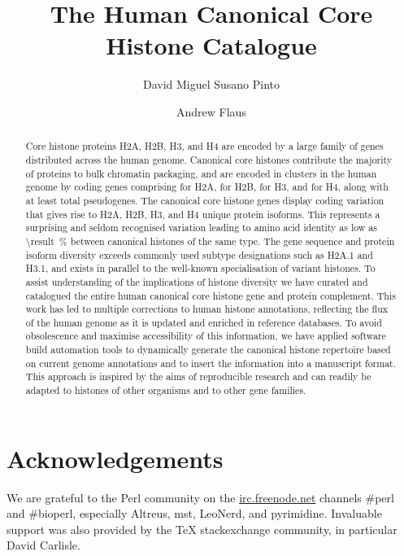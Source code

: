 \documentclass[10pt,a4paper,onecolumn,article,draft]{memoir}
\author{David Miguel Susano Pinto \and Andrew Flaus}
\title{The Human Canonical Core Histone Catalogue}
\begin{document}
  \maketitle

  \begin{abstract}
    Core histone proteins H2A, H2B, H3, and H4 are encoded
    by a large family of genes distributed across the human genome.
    Canonical core histones contribute the majority of proteins to bulk
    chromatin packaging,
    and are encoded in \NumberOfClusters{} clusters in the human genome
    by \TotalCoreCodingGenes{} coding genes comprising
    \HTwoACodingGenes{} for H2A,
    \HTwoBCodingGenes{} for H2B,
    \HThreeCodingGenes{} for H3,
    and \HFourCodingGenes{} for H4,
    along with at least \TotalCorePseudoGenes{} total pseudogenes.
    The canonical core histone genes display coding variation that gives rise to
    \HTwoAUniqueProteins{} H2A, \HTwoBUniqueProteins{} H2B,
    \HThreeUniqueProteins{} H3, and \HFourUniqueProteins{} H4 unique protein isoforms.
    This represents a surprising and seldom recognised variation
    leading to amino acid identity as low as
     \SI{\result}{\percent}
    between canonical histones of the same type.
    The gene sequence and protein isoform diversity
    exceeds commonly used subtype designations such as H2A.1 and H3.1,
    and exists in parallel to the well-known specialisation of variant histones.
    To assist understanding of the implications of histone diversity
    we have curated and catalogued the entire human canonical core
    histone gene and protein complement.
    This work has led to multiple corrections to human histone annotations,
    reflecting the flux of the human genome as it is updated and
    enriched in reference databases.
    To avoid obsolescence and maximise accessibility of this information,
    we have applied software build automation tools to
    dynamically generate the canonical histone repertoire
    based on current genome annotations and to insert the information
    into a manuscript format.
    This approach is inspired by the aims of reproducible research
    and can readily be adapted to histones of other organisms and
    to other gene families.
  \end{abstract}

  
  
  
  
  
  
  

  \section{Acknowledgements}
    We are grateful to the Perl community on the \url{irc.freenode.net}
    channels \#perl and \#bioperl,
    especially Altreus, mst, LeoNerd, and pyrimidine.
    Invaluable support was also provided by the \TeX{} stackexchange community,
    in particular David Carlisle.

  

  \newpage
  \appendix
  
\end{document}
